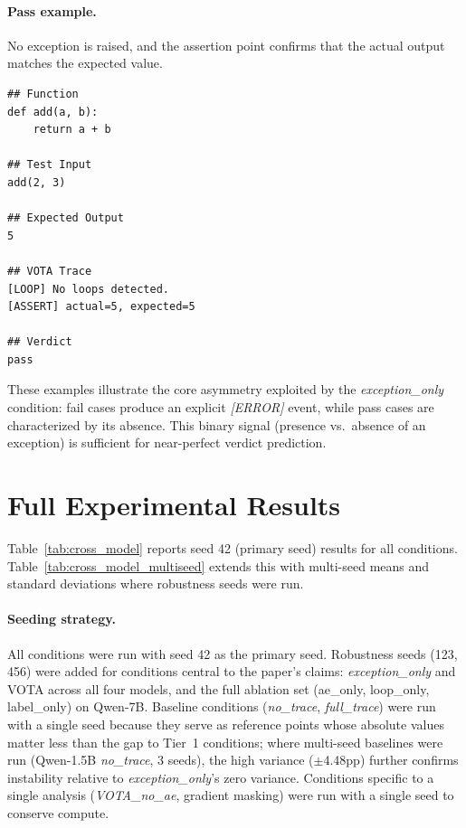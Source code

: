\paragraph{Pass example.}
No exception is raised, and the assertion point confirms that the actual output matches the expected value.

\begin{scriptsize}
\begin{verbatim}
## Function
def add(a, b):
    return a + b

## Test Input
add(2, 3)

## Expected Output
5

## VOTA Trace
[LOOP] No loops detected.
[ASSERT] actual=5, expected=5

## Verdict
pass
\end{verbatim}
\end{scriptsize}

These examples illustrate the core asymmetry exploited by the \textit{exception\_only} condition: fail cases produce an explicit \textit{[ERROR]} event, while pass cases are characterized by its absence.
This binary signal (presence vs.\ absence of an exception) is sufficient for near-perfect verdict prediction.

\section{Full Experimental Results}
\label{sec:full_results}

Table~\ref{tab:cross_model} reports seed 42 (primary seed) results for all conditions.
Table~\ref{tab:cross_model_multiseed} extends this with multi-seed means and standard deviations where robustness seeds were run.

\paragraph{Seeding strategy.}
All conditions were run with seed 42 as the primary seed.
Robustness seeds (123, 456) were added for conditions central to the paper's claims: \textit{exception\_only} and VOTA across all four models, and the full ablation set (ae\_only, loop\_only, label\_only) on Qwen-7B.
Baseline conditions (\textit{no\_trace}, \textit{full\_trace}) were run with a single seed because they serve as reference points whose absolute values matter less than the gap to Tier~1 conditions; where multi-seed baselines were run (Qwen-1.5B \textit{no\_trace}, 3 seeds), the high variance ($\pm$4.48pp) further confirms instability relative to \textit{exception\_only}'s zero variance.
Conditions specific to a single analysis (\textit{VOTA\_no\_ae}, gradient masking) were run with a single seed to conserve compute.

